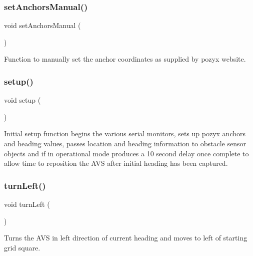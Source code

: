 \mbox{\label{bot_main_8ino_ad401219e4b701bed928f7caafd7108f2}} 
\subsubsection{\texorpdfstring{set\+Anchors\+Manual()}{setAnchorsManual()}}
{\footnotesize\ttfamily void set\+Anchors\+Manual (\begin{DoxyParamCaption}{ }\end{DoxyParamCaption})}



Function to manually set the anchor coordinates as supplied by pozyx website. 

\mbox{\label{bot_main_8ino_a4fc01d736fe50cf5b977f755b675f11d}} 
\subsubsection{\texorpdfstring{setup()}{setup()}}
{\footnotesize\ttfamily void setup (\begin{DoxyParamCaption}{ }\end{DoxyParamCaption})}

Initial setup function begins the various serial monitors, sets up pozyx anchors and heading values, passes location and heading information to obstacle sensor objects and if in operational mode produces a 10 second delay once complete to allow time to reposition the A\+VS after initial heading has been captured. \mbox{\label{bot_main_8ino_adaf487f84c38e060c84f3cb829e70f2b}} 
\subsubsection{\texorpdfstring{turn\+Left()}{turnLeft()}}
{\footnotesize\ttfamily void turn\+Left (\begin{DoxyParamCaption}{ }\end{DoxyParamCaption})}

Turns the A\+VS in left direction of current heading and moves to left of starting grid square. \mbox{\label{bot_main_8ino_acf4fa5da14085c3a9a170f9de29d2755}} 
